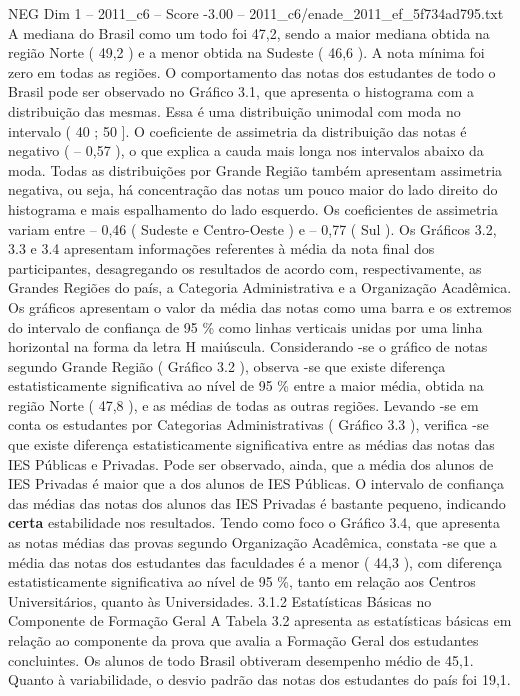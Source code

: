 \begin{textsample}{NEG Dim 1 – 2011\_c6 – Score -3.00 – 2011\_c6/enade\_2011\_ef\_5f734ad795.txt}
A mediana do Brasil como um todo foi 47,2, sendo a maior mediana obtida na região Norte ( 49,2 ) e a menor obtida na Sudeste ( 46,6 ).
A nota mínima foi zero em todas as regiões.
O comportamento das notas dos estudantes de todo o Brasil pode ser observado no Gráfico 3.1, que apresenta o histograma com a distribuição das mesmas.
Essa é uma distribuição unimodal com moda no intervalo ( 40 ; 50 ].
O coeficiente de assimetria da distribuição das notas é negativo ( – 0,57 ), o que explica a cauda mais longa nos intervalos abaixo da moda.
Todas as distribuições por Grande Região também apresentam assimetria negativa, ou seja, há concentração das notas um pouco maior do lado direito do histograma e mais espalhamento do lado esquerdo.
Os coeficientes de assimetria variam entre – 0,46 ( Sudeste e Centro-Oeste ) e – 0,77 ( Sul ).
Os Gráficos 3.2, 3.3 e 3.4 apresentam informações referentes à média da nota final dos participantes, desagregando os resultados de acordo com, respectivamente, as Grandes Regiões do país, a Categoria Administrativa e a Organização Acadêmica.
Os gráficos apresentam o valor da média das notas como uma barra e os extremos do intervalo de confiança de 95 \% como linhas verticais unidas por uma linha horizontal na forma da letra H maiúscula.
Considerando -se o gráfico de notas segundo Grande Região ( Gráfico 3.2 ), observa -se que existe diferença estatisticamente significativa ao nível de 95 \% entre a maior média, obtida na região Norte ( 47,8 ), e as médias de todas as outras regiões.
Levando -se em conta os estudantes por Categorias Administrativas ( Gráfico 3.3 ), verifica -se que existe diferença estatisticamente significativa entre as médias das notas das IES Públicas e Privadas.
Pode ser observado, ainda, que a média dos alunos de IES Privadas é maior que a dos alunos de IES Públicas.
O intervalo de confiança das médias das notas dos alunos das IES Privadas é bastante pequeno, indicando \textbf{certa} estabilidade nos resultados.
Tendo como foco o Gráfico 3.4, que apresenta as notas médias das provas segundo Organização Acadêmica, constata -se que a média das notas dos estudantes das faculdades é a menor ( 44,3 ), com diferença estatisticamente significativa ao nível de 95 \%, tanto em relação aos Centros Universitários, quanto às Universidades. 3.1.2 Estatísticas Básicas no Componente de Formação Geral A Tabela 3.2 apresenta as estatísticas básicas em relação ao componente da prova que avalia a Formação Geral dos estudantes concluintes.
Os alunos de todo Brasil obtiveram desempenho médio de 45,1.
Quanto à variabilidade, o desvio padrão das notas dos estudantes do país foi 19,1.

\end{textsample}

